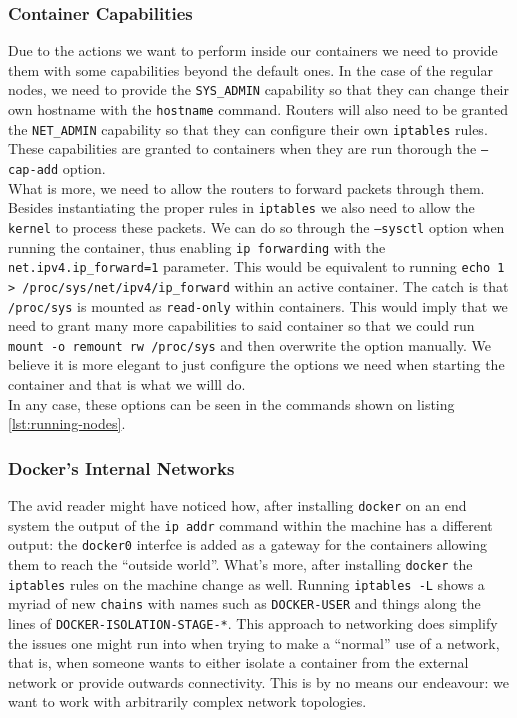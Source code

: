             \subsubsection{Container Capabilities}
                Due to the actions we want to perform inside our containers we need to provide them with some capabilities beyond the default ones. In the case of the regular nodes, we need to provide the \texttt{SYS\_ADMIN} capability so that they can change their own hostname with the \texttt{hostname} command. Routers will also need to be granted the \texttt{NET\_ADMIN} capability so that they can configure their own \texttt{iptables} rules. These capabilities are granted to containers when they are run thorough the \texttt{--cap-add} option.\\

                What is more, we need to allow the routers to forward packets through them. Besides instantiating the proper rules in \texttt{iptables} we also need to allow the \texttt{kernel} to process these packets. We can do so through the \texttt{--sysctl} option when running the container, thus enabling \texttt{ip forwarding} with the \texttt{net.ipv4.ip\_forward=1} parameter. This would be equivalent to running \texttt{\allowbreak echo 1 > /proc/sys/net/ipv4/ip\_forward} within an active container. The catch is that \texttt{/proc/sys} is mounted as \texttt{read-only} within containers. This would imply that we need to grant many more capabilities to said container so that we could run \texttt{mount -o remount rw /proc/sys} and then overwrite the option manually. We believe it is more elegant to just configure the options we need when starting the container and that is what we willl do.\\

                In any case, these options can be seen in the commands shown on listing \ref{lst:running-nodes}.\\

            \subsubsection{Docker's Internal Networks}
                The avid reader might have noticed how, after installing \texttt{docker} on an end system the output of the \texttt{ip addr} command within the machine has a different output: the \texttt{docker0} interfce is added as a gateway for the containers allowing them to reach the ``outside world''. What's more, after installing \texttt{docker} the \texttt{iptables} rules on the machine change as well. Running \texttt{iptables -L} shows a myriad of new \texttt{chains} with names such as \texttt{DOCKER-USER} and things along the lines of \texttt{DOCKER-ISOLATION-STAGE-*}. This approach to networking does simplify the issues one might run into when trying to make a ``normal'' use of a network, that is, when someone wants to either isolate a container from the external network or provide outwards connectivity. This is by no means our endeavour: we want to work with arbitrarily complex network topologies.\\

